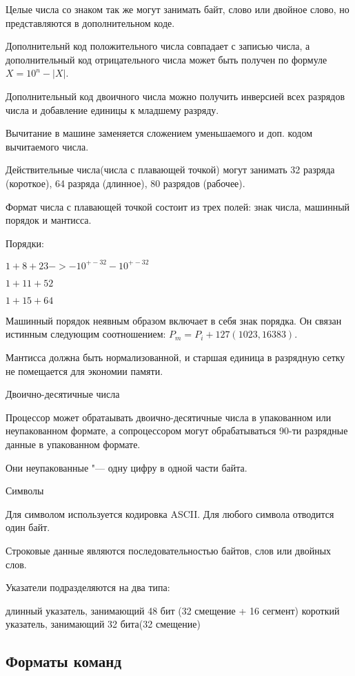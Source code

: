 Целые числа со знаком так же могут занимать байт, слово или двойное слово, но представляются в дополнительном коде.

Дополнительнй код положительного числа совпадает с записью числа, а дополнительный код отрицательного числа может быть получен по
формуле $X = 10^n - |X|$.

Дополнительный код двоичного числа можно получить инверсией всех разрядов числа и добавление единицы к младшему разряду.

Вычитание в машине заменяется сложением уменьшаемого и доп. кодом вычитаемого числа. 

Действительные числа(числа с плавающей точкой) могут занимать 32 разряда (короткое), 64 разряда (длинное), 80 разрядов (рабочее).

Формат числа с плавающей точкой состоит из трех полей: знак числа, машинный порядок и мантисса.

Порядки:

$1 + 8 + 23 -> -10^{+-32} - 10^{+-32}$

$1 + 11 + 52$

$1 + 15+ 64$

Машинный порядок неявным образом включает в себя знак порядка. Он связан истинным следующим соотношением: $P_m = P_i + 127(1023, 16383)$.

Мантисса должна быть нормализованной, и старшая единица в разрядную сетку не помещается для экономии памяти.

Двоично-десятичные числа

Процессор может обратаывать двоично-десятичные числа в упакованном или неупакованном формате, а 
сопроцессором могут обрабатываться 90-ти разрядные данные в упакованном формате.

Они неупакованные "--- одну цифру в одной части байта.

Символы

Для символом используется кодировка ASCII. Для любого символа отводится один байт.

Строковые данные являются последовательностью байтов, слов или двойных слов.

Указатели подразделяются на два типа:

длинный указатель, занимающий 48 бит (32 смещение + 16 сегмент)
короткий указатель, занимающий 32 бита(32 смещение)

\subsection{Форматы команд}

